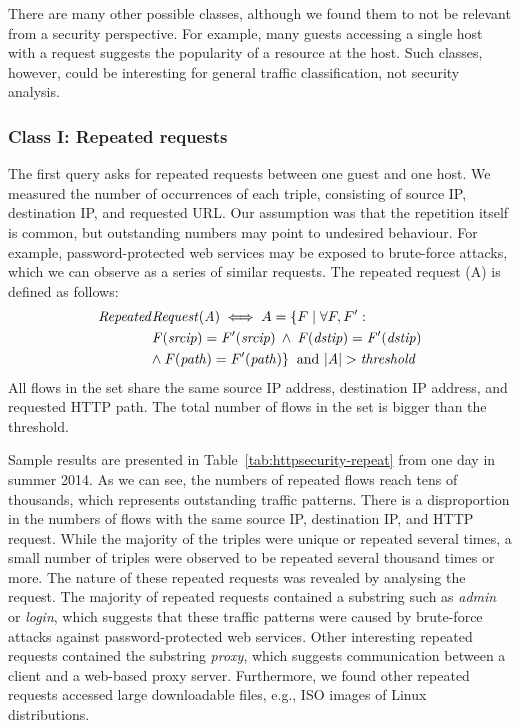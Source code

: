 There are many other possible classes, although we found them to not be relevant from a security perspective. For example, many guests accessing a single host with a request suggests the popularity of a resource at the host. Such classes, however, could be interesting for general traffic classification, not security analysis.

\subsubsection{Class I: Repeated requests}

The first query asks for repeated requests between one guest and one host. We measured the number of occurrences of each triple, consisting of source IP, destination IP, and requested URL. Our assumption was that the repetition itself is common, but outstanding numbers may point to undesired behaviour. For example, password-protected web services may be exposed to brute-force attacks, which we can observe as a series of similar requests. The repeated request (A) is defined as follows:
\begin{equation*}
\begin{split}
\mathit{Repeated}&\mathit{Request(A)} \iff A = \{F \mid \forall F, F':\\
&\mathit{F(srcip) = F'(srcip) \: \land \: F(dstip) = F'(dstip)}\\
&\mathit{\land \: F(path) = F'(path)\} \: \mbox{ and } |A| > threshold}
\end{split}
\end{equation*}
All flows in the set share the same source IP address, destination IP address, and requested HTTP path. The total number of flows in the set is bigger than the threshold.

Sample results are presented in Table~\ref{tab:httpsecurity-repeat} from one day in summer 2014. As we can see, the numbers of repeated flows reach tens of thousands, which represents outstanding traffic patterns. There is a disproportion in the numbers of flows with the same source IP, destination IP, and HTTP request. While the majority of the triples were unique or repeated several times, a small number of triples were observed to be repeated several thousand times or more. The nature of these repeated requests was revealed by analysing the request. The majority of repeated requests contained a substring such as \textit{admin} or \textit{login}, which suggests that these traffic patterns were caused by brute-force attacks against password-protected web services. Other interesting repeated requests contained the substring \textit{proxy}, which suggests communication between a client and a web-based proxy server. Furthermore, we found other repeated requests accessed large downloadable files, e.g., ISO images of Linux distributions.

